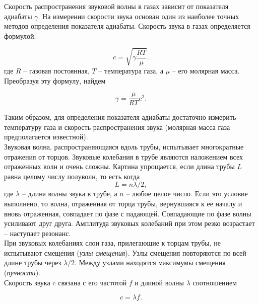 \documentclass[a4paper, 12pt]{article}
\begin{document}
        \noindent Скорость распространения звуковой волны в газах зависит от показателя адиабаты $\gamma$. На измерении скорости звука основан один из наиболее точных методов определения показателя адиабаты. Скорость звука в газах определяется формулой:

        \begin{equation}\label{velocity}
            c=\sqrt{\gamma\frac{RT}{\mu}}.
        \end{equation}
        \noindent где $R$ -- газовая постоянная, $T$ -- температура газа, а $\mu$ -- его молярная масса. Преобразуя эту формулу, найдем
        
        \begin{equation}
            \label{gamma}
            \boxed{\gamma = \frac{\mu}{RT}c^2}.
        \end{equation}

        \noindent Таким образом, для определения показателя адиабаты достаточно измерить температуру газа и скорость распространения звука (молярная масса газа предполагается известной).\\

        \noindent Звуковая волна, распространяющаяся вдоль трубы, испытывает многократные отражения от торцов. Звуковые колебания в трубе являются наложением всех отраженных волн и очень сложны. Картина упрощается, если длина трубы $L$ равна целому числу полуволн, то есть когда \[ L=n\lambda/2, \] где $\lambda$ -- длина волны звука в трубе, а $n$ -- любое целое число. Если это условие выполнено, то волна, отраженная от торца трубы, вернувшаяся к ее началу и вновь отраженная, совпадает по фазе с падающей. Совпадающие по фазе волны усиливают друг друга. Амплитуда звуковых колебаний при этом резко возрастает -- наступает резонанс.\\

        \noindent При звуковых колебаниях слои газа, прилегающие к торцам трубы, не испытывают смещения (\textit{узлы смещения}). Узлы смещения повторяются по всей длине трубы через $\lambda/2$. Между узлами находятся максимумы смещения (\textit{пучности}).\\

        \noindent Скорость звука c связана с его частотой $f$ и длиной волны $\lambda$ соотношением

        \begin{equation}
            \label{lambda_f}
            c=\lambda f.
        \end{equation}
\end{document}
